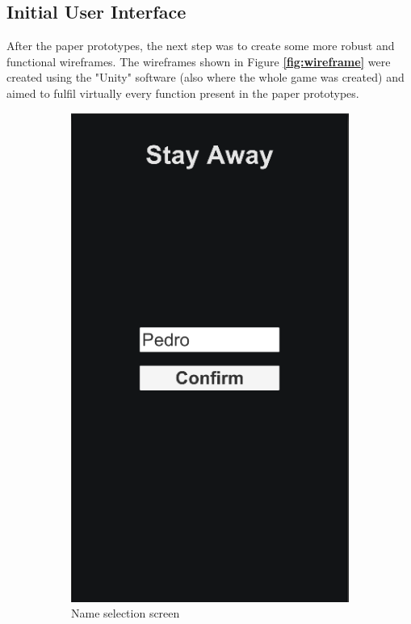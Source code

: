 \documentclass{dissertation}
\begin{document}
\subsection{Initial User Interface}

After the paper prototypes, the next step was to create some more robust and functional wireframes. The wireframes shown in Figure \textbf{\ref{fig:wireframe}} were created using the "Unity" software (also where the whole game was created) and aimed to fulfil virtually every function present in the paper prototypes. 

\begin{figure}[H]
\begin{subfigure}[h]{.5\textwidth}
\centering
\includegraphics[width = .7\linewidth]{images/wireframe1.png}
\caption{Name selection screen}
\label{fig:pp1}
\end{subfigure}
\begin{subfigure}[h]{.5\textwidth}
\centering

\end{subfigure}
\end{figure}
\end{document}
